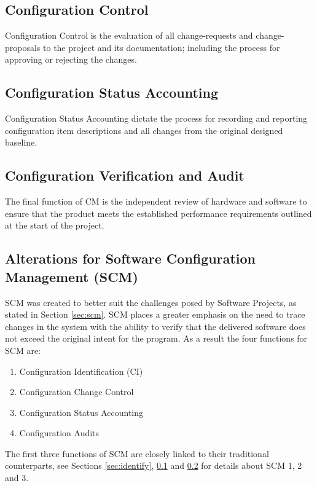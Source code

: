 \documentclass[cmpstyle]{ueacmpstyle}
\begin{document}
		\subsection{Configuration Control} \label{sec:control}
		Configuration Control is the evaluation of all change-requests and change-proposals to the project and its documentation; including the process for approving or rejecting the changes.
		
		\subsection{Configuration Status Accounting} \label{sec:accounting}
		Configuration Status Accounting dictate the process for recording and reporting configuration item descriptions and all changes from the original designed baseline.
		
		\subsection{Configuration Verification and Audit} \label{sec:audit}
		The final function of CM is the independent review of hardware and software to ensure that the product meets the established performance requirements outlined at the start of the project.
		
		\subsection{Alterations for Software Configuration Management (SCM)} \label{sec:scm-alterations}
		SCM was created to better suit the challenges posed by Software Projects, as stated in Section \ref{sec:scm}. SCM places a greater emphasis on the need to trace changes in the system with the ability to verify that the delivered software does not exceed the original intent for the program. As a result the four functions for SCM are:
		
		\begin{enumerate}
			\item Configuration Identification (CI)
			\item Configuration Change Control
			\item Configuration Status Accounting
			\item Configuration Audits
		\end{enumerate}
	
		The first three functions of SCM are closely linked to their traditional counterparts, see Sections \ref{sec:identify}, \ref{sec:control} and \ref{sec:accounting} for details about SCM 1, 2 and 3. 
		
\end{document}
